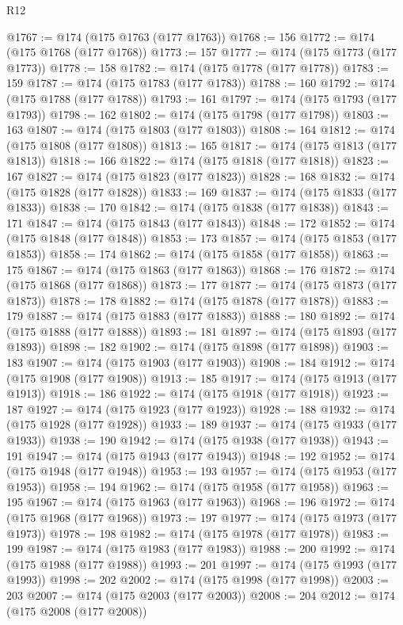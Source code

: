 \begin{lexlean}{R12}
\begin{coremodule}
@1767 := @174 (@175 @1763 (@177 @1763))
@1768 := 156
@1772 := @174 (@175 @1768 (@177 @1768))
@1773 := 157
@1777 := @174 (@175 @1773 (@177 @1773))
@1778 := 158
@1782 := @174 (@175 @1778 (@177 @1778))
@1783 := 159
@1787 := @174 (@175 @1783 (@177 @1783))
@1788 := 160
@1792 := @174 (@175 @1788 (@177 @1788))
@1793 := 161
@1797 := @174 (@175 @1793 (@177 @1793))
@1798 := 162
@1802 := @174 (@175 @1798 (@177 @1798))
@1803 := 163
@1807 := @174 (@175 @1803 (@177 @1803))
@1808 := 164
@1812 := @174 (@175 @1808 (@177 @1808))
@1813 := 165
@1817 := @174 (@175 @1813 (@177 @1813))
@1818 := 166
@1822 := @174 (@175 @1818 (@177 @1818))
@1823 := 167
@1827 := @174 (@175 @1823 (@177 @1823))
@1828 := 168
@1832 := @174 (@175 @1828 (@177 @1828))
@1833 := 169
@1837 := @174 (@175 @1833 (@177 @1833))
@1838 := 170
@1842 := @174 (@175 @1838 (@177 @1838))
@1843 := 171
@1847 := @174 (@175 @1843 (@177 @1843))
@1848 := 172
@1852 := @174 (@175 @1848 (@177 @1848))
@1853 := 173
@1857 := @174 (@175 @1853 (@177 @1853))
@1858 := 174
@1862 := @174 (@175 @1858 (@177 @1858))
@1863 := 175
@1867 := @174 (@175 @1863 (@177 @1863))
@1868 := 176
@1872 := @174 (@175 @1868 (@177 @1868))
@1873 := 177
@1877 := @174 (@175 @1873 (@177 @1873))
@1878 := 178
@1882 := @174 (@175 @1878 (@177 @1878))
@1883 := 179
@1887 := @174 (@175 @1883 (@177 @1883))
@1888 := 180
@1892 := @174 (@175 @1888 (@177 @1888))
@1893 := 181
@1897 := @174 (@175 @1893 (@177 @1893))
@1898 := 182
@1902 := @174 (@175 @1898 (@177 @1898))
@1903 := 183
@1907 := @174 (@175 @1903 (@177 @1903))
@1908 := 184
@1912 := @174 (@175 @1908 (@177 @1908))
@1913 := 185
@1917 := @174 (@175 @1913 (@177 @1913))
@1918 := 186
@1922 := @174 (@175 @1918 (@177 @1918))
@1923 := 187
@1927 := @174 (@175 @1923 (@177 @1923))
@1928 := 188
@1932 := @174 (@175 @1928 (@177 @1928))
@1933 := 189
@1937 := @174 (@175 @1933 (@177 @1933))
@1938 := 190
@1942 := @174 (@175 @1938 (@177 @1938))
@1943 := 191
@1947 := @174 (@175 @1943 (@177 @1943))
@1948 := 192
@1952 := @174 (@175 @1948 (@177 @1948))
@1953 := 193
@1957 := @174 (@175 @1953 (@177 @1953))
@1958 := 194
@1962 := @174 (@175 @1958 (@177 @1958))
@1963 := 195
@1967 := @174 (@175 @1963 (@177 @1963))
@1968 := 196
@1972 := @174 (@175 @1968 (@177 @1968))
@1973 := 197
@1977 := @174 (@175 @1973 (@177 @1973))
@1978 := 198
@1982 := @174 (@175 @1978 (@177 @1978))
@1983 := 199
@1987 := @174 (@175 @1983 (@177 @1983))
@1988 := 200
@1992 := @174 (@175 @1988 (@177 @1988))
@1993 := 201
@1997 := @174 (@175 @1993 (@177 @1993))
@1998 := 202
@2002 := @174 (@175 @1998 (@177 @1998))
@2003 := 203
@2007 := @174 (@175 @2003 (@177 @2003))
@2008 := 204
@2012 := @174 (@175 @2008 (@177 @2008))

\end{coremodule}
\end{lexlean}
